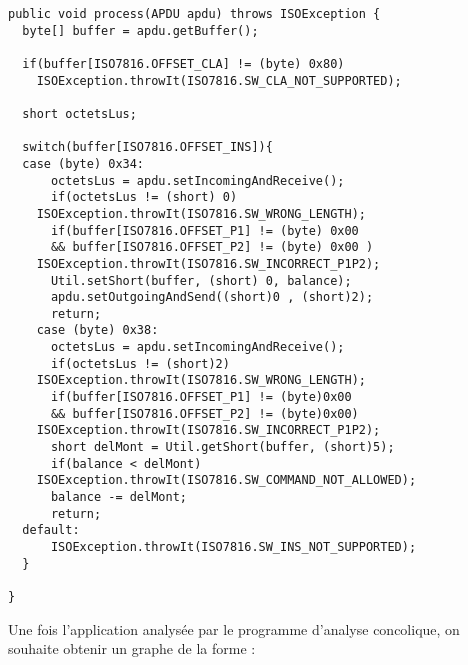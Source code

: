 \begin{verbatim}
public void process(APDU apdu) throws ISOException {
  byte[] buffer = apdu.getBuffer();
      
  if(buffer[ISO7816.OFFSET_CLA] != (byte) 0x80)
    ISOException.throwIt(ISO7816.SW_CLA_NOT_SUPPORTED);
      
  short octetsLus;
      
  switch(buffer[ISO7816.OFFSET_INS]){
  case (byte) 0x34:
      octetsLus = apdu.setIncomingAndReceive();
      if(octetsLus != (short) 0)
	ISOException.throwIt(ISO7816.SW_WRONG_LENGTH);
      if(buffer[ISO7816.OFFSET_P1] != (byte) 0x00 
	  && buffer[ISO7816.OFFSET_P2] != (byte) 0x00 )
	ISOException.throwIt(ISO7816.SW_INCORRECT_P1P2);
      Util.setShort(buffer, (short) 0, balance);
      apdu.setOutgoingAndSend((short)0 , (short)2);
      return;
    case (byte) 0x38:
      octetsLus = apdu.setIncomingAndReceive();
      if(octetsLus != (short)2)
	ISOException.throwIt(ISO7816.SW_WRONG_LENGTH);
      if(buffer[ISO7816.OFFSET_P1] != (byte)0x00 
	  && buffer[ISO7816.OFFSET_P2] != (byte)0x00)
	ISOException.throwIt(ISO7816.SW_INCORRECT_P1P2);
      short delMont = Util.getShort(buffer, (short)5);
      if(balance < delMont)
	ISOException.throwIt(ISO7816.SW_COMMAND_NOT_ALLOWED);
      balance -= delMont;
      return;
  default:
      ISOException.throwIt(ISO7816.SW_INS_NOT_SUPPORTED);
  }

}
\end{verbatim}

Une fois l'application analysée par le programme d'analyse concolique, on souhaite obtenir un graphe de la forme : 

~

